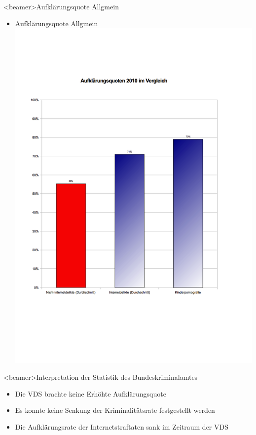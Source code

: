              \begin{frame}<beamer>{Aufklärungsquote Allgmein}
\begin{itemize}
        \item Aufklärungsquote Allgmein
        \includegraphics[height=1\textheight]{sections/img/aufklaerung.png}
    \end{itemize}
    \end{frame}
              \begin{frame}<beamer>{Interpretation der Statistik des Bundeskriminalamtes}
\begin{itemize}
        \item Die VDS brachte keine Erhöhte Aufklärungsquote
        \item Es konnte keine Senkung der Kriminalitätsrate festgestellt werden
        \item Die Aufklärungsrate der Internetstraftaten sank im Zeitraum der VDS
    \end{itemize}
    \end{frame}



